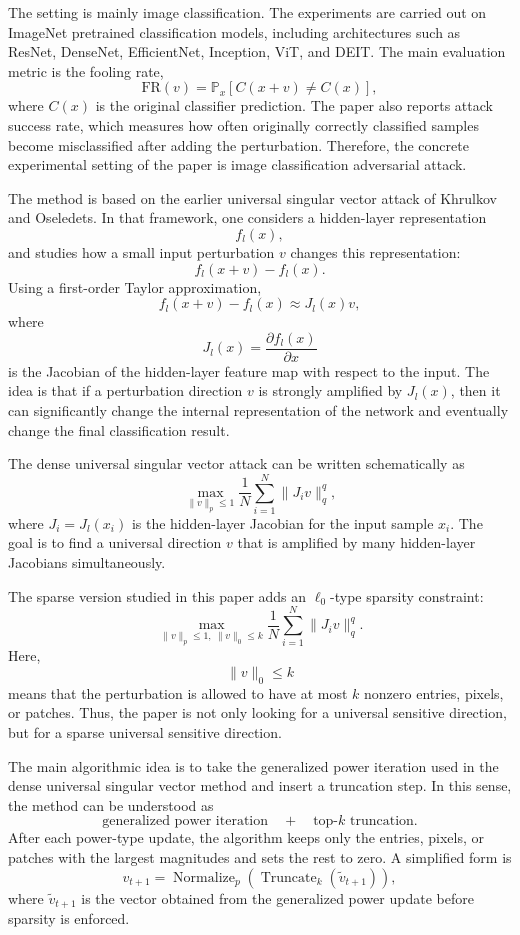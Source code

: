 \documentclass{article}
\begin{document}
The setting is mainly image classification. The experiments are carried out on ImageNet pretrained classification models, including architectures such as ResNet, DenseNet, EfficientNet, Inception, ViT, and DEIT. The main evaluation metric is the fooling rate,
\[
    \mathrm{FR}(v)
    =
    \mathbb{P}_{x}
    \left[
        C(x+v)\neq C(x)
    \right],
\]
where \(C(x)\) is the original classifier prediction. The paper also reports attack success rate, which measures how often originally correctly classified samples become misclassified after adding the perturbation. Therefore, the concrete experimental setting of the paper is image classification adversarial attack.

The method is based on the earlier universal singular vector attack of Khrulkov and Oseledets. In that framework, one considers a hidden-layer representation
\[
    f_l(x),
\]
and studies how a small input perturbation \(v\) changes this representation:
\[
    f_l(x+v)-f_l(x).
\]
Using a first-order Taylor approximation,
\[
    f_l(x+v)-f_l(x)
    \approx
    J_l(x)v,
\]
where
\[
    J_l(x)
    =
    \frac{\partial f_l(x)}{\partial x}
\]
is the Jacobian of the hidden-layer feature map with respect to the input. The idea is that if a perturbation direction \(v\) is strongly amplified by \(J_l(x)\), then it can significantly change the internal representation of the network and eventually change the final classification result.

The dense universal singular vector attack can be written schematically as
\[
    \max_{\|v\|_p\leq 1}
    \frac{1}{N}
    \sum_{i=1}^{N}
    \|J_i v\|_q^q,
\]
where \(J_i = J_l(x_i)\) is the hidden-layer Jacobian for the input sample \(x_i\). The goal is to find a universal direction \(v\) that is amplified by many hidden-layer Jacobians simultaneously.

The sparse version studied in this paper adds an \(\ell_0\)-type sparsity constraint:
\[
    \max_{\|v\|_p\leq 1,\ \|v\|_0\leq k}
    \frac{1}{N}
    \sum_{i=1}^{N}
    \|J_i v\|_q^q.
\]
Here,
\[
    \|v\|_0\leq k
\]
means that the perturbation is allowed to have at most \(k\) nonzero entries, pixels, or patches. Thus, the paper is not only looking for a universal sensitive direction, but for a sparse universal sensitive direction.

The main algorithmic idea is to take the generalized power iteration used in the dense universal singular vector method and insert a truncation step. In this sense, the method can be understood as
\[
    \text{generalized power iteration}
    \quad+\quad
    \text{top-}k\text{ truncation}.
\]
After each power-type update, the algorithm keeps only the entries, pixels, or patches with the largest magnitudes and sets the rest to zero. A simplified form is
\[
    v_{t+1}
    =
    \operatorname{Normalize}_{p}
    \left(
        \operatorname{Truncate}_{k}
        \left(
            \widetilde v_{t+1}
        \right)
    \right),
\]
where \(\widetilde v_{t+1}\) is the vector obtained from the generalized power update before sparsity is enforced.
\end{document}
